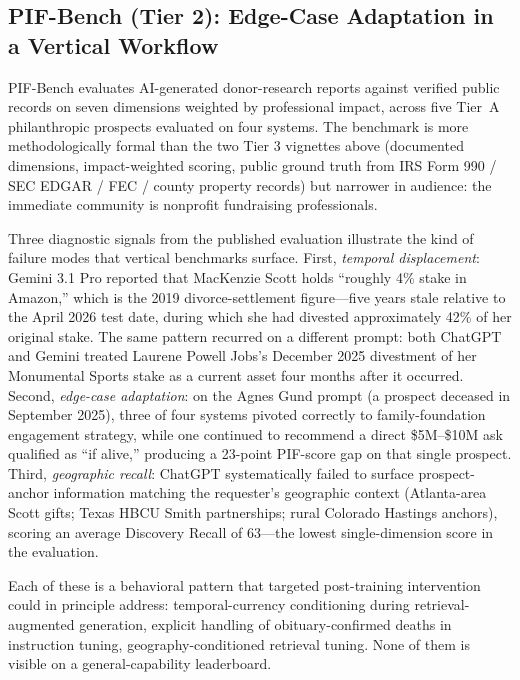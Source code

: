 \documentclass[11pt,a4paper]{article}
\begin{document}
\subsection{PIF-Bench (Tier 2): Edge-Case Adaptation in a Vertical Workflow}
\label{sec:vignette-pif}

PIF-Bench \citep{lijo2026pifbench} evaluates AI-generated donor-research reports against verified public records on seven dimensions weighted by professional impact, across five Tier~A philanthropic prospects evaluated on four systems. The benchmark is more methodologically formal than the two Tier 3 vignettes above (documented dimensions, impact-weighted scoring, public ground truth from IRS Form 990 / SEC EDGAR / FEC / county property records) but narrower in audience: the immediate community is nonprofit fundraising professionals.

Three diagnostic signals from the published evaluation \citep{lijo2026pifbench} illustrate the kind of failure modes that vertical benchmarks surface. First, \textit{temporal displacement}: Gemini 3.1 Pro reported that MacKenzie Scott holds ``roughly 4\% stake in Amazon,'' which is the 2019 divorce-settlement figure---five years stale relative to the April 2026 test date, during which she had divested approximately 42\% of her original stake. The same pattern recurred on a different prompt: both ChatGPT and Gemini treated Laurene Powell Jobs's December 2025 divestment of her Monumental Sports stake as a current asset four months after it occurred. Second, \textit{edge-case adaptation}: on the Agnes Gund prompt (a prospect deceased in September 2025), three of four systems pivoted correctly to family-foundation engagement strategy, while one continued to recommend a direct \$5M--\$10M ask qualified as ``if alive,'' producing a 23-point PIF-score gap on that single prospect. Third, \textit{geographic recall}: ChatGPT systematically failed to surface prospect-anchor information matching the requester's geographic context (Atlanta-area Scott gifts; Texas HBCU Smith partnerships; rural Colorado Hastings anchors), scoring an average Discovery Recall of 63---the lowest single-dimension score in the evaluation.

Each of these is a behavioral pattern that targeted post-training intervention could in principle address: temporal-currency conditioning during retrieval-augmented generation, explicit handling of obituary-confirmed deaths in instruction tuning, geography-conditioned retrieval tuning. None of them is visible on a general-capability leaderboard.
\end{document}
